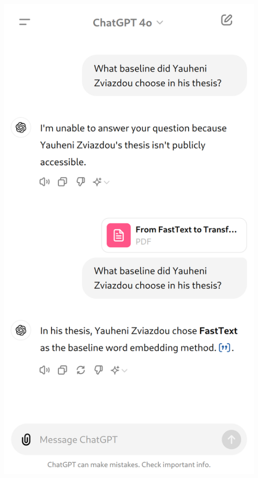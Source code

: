 \documentclass{beamer}
\begin{document}
\begin{frame}
\begin{columns}
\begin{column}{0.5\textwidth}
      \includegraphics[scale=0.15]{src/fig/imgs/RAG_example.png}
    \end{column}
  \end{columns}
\end{frame}
\end{document}
